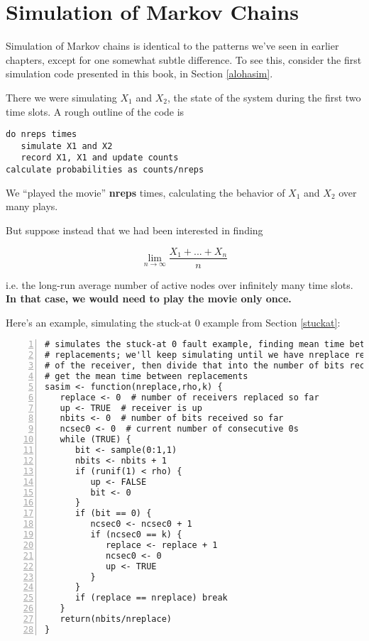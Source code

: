 \section{Simulation of Markov Chains}

Simulation of Markov chains is identical to the patterns we've seen in
earlier chapters, except for one somewhat subtle difference.  To see
this, consider the first simulation code presented in this book, in
Section \ref{alohasim}.  

There we were simulating $X_1$ and $X_2$, the state of the system during
the first two time slots.  A rough outline of the code is

\begin{Verbatim}[fontsize=\relsize{-2}]
do nreps times
   simulate X1 and X2
   record X1, X1 and update counts
calculate probabilities as counts/nreps
\end{Verbatim}

We ``played the movie'' {\bf nreps} times, calculating the behavior of
 $X_1$ and $X_2$ over many plays.

But suppose instead that we had been interested in finding

\begin{equation}
\lim_{n \rightarrow \infty} \frac{X_1+...+X_n}{n}
\end{equation}

i.e. the long-run average number of active nodes over infinitely many
time slots.  {\bf In that case, we would need to play the movie only
once.}

Here's an example, simulating the stuck-at 0 example from Section
\ref{stuckat}:

\begin{Verbatim}[fontsize=\relsize{-2},numbers=left]
# simulates the stuck-at 0 fault example, finding mean time between
# replacements; we'll keep simulating until we have nreplace replacements
# of the receiver, then divide that into the number of bits received, to
# get the mean time between replacements
sasim <- function(nreplace,rho,k) {
   replace <- 0  # number of receivers replaced so far
   up <- TRUE  # receiver is up
   nbits <- 0  # number of bits received so far
   ncsec0 <- 0  # current number of consecutive 0s 
   while (TRUE) {
      bit <- sample(0:1,1)
      nbits <- nbits + 1
      if (runif(1) < rho) {
         up <- FALSE
         bit <- 0
      }
      if (bit == 0) {
         ncsec0 <- ncsec0 + 1
         if (ncsec0 == k) {
            replace <- replace + 1
            ncsec0 <- 0
            up <- TRUE
         }
      }
      if (replace == nreplace) break
   }
   return(nbits/nreplace)
}
\end{Verbatim}

